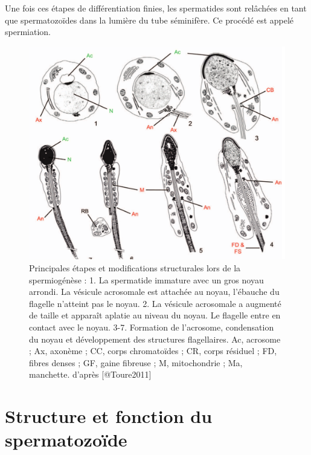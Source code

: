 \documentclass[12pt,twoside]{reedthesis}
\theoremstyle{definition}
\theoremstyle{definition}
\theoremstyle{remark}
\begin{document}
  Une fois ces étapes de différentiation finies, les spermatides sont
  relâchées en tant que spermatozoïdes dans la lumière du tube séminifère.
  Ce procédé est appelé spermiation.
  
  \begin{figure}
  
  {\centering \includegraphics[scale=0.3]{figure/spermiogenese} 
  
  }
  
  \caption[Principales étapes et modifications structurales lors de la spermiogénèse]{Principales étapes et modifications structurales lors de la spermiogénèse : 1. La spermatide immature avec un gros noyau arrondi. La vésicule acrosomale est attachée au noyau, l’ébauche du flagelle n’atteint pas le noyau. 2. La vésicule acrosomale a augmenté de taille et apparaît aplatie au niveau du noyau. Le flagelle entre en contact avec le noyau. 3-7. Formation de l’acrosome, condensation du noyau et développement des structures flagellaires. Ac, acrosome ; Ax, axonème ; CC, corps chromatoïdes ; CR, corps résiduel ; FD, fibres denses ; GF, gaine fibreuse ; M, mitochondrie ; Ma, manchette. d'après [@Toure2011]}\label{fig:spermiogenese}
  \end{figure}
  
  \newpage  
  
  \section{Structure et fonction du
  spermatozoïde}\label{structure-et-fonction-du-spermatozoide}
  
\end{document}
